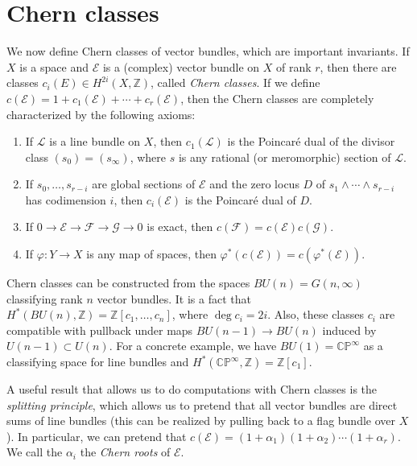 \documentclass{amsart}
\theoremstyle{definition}
\theoremstyle{remark}
\theoremstyle{plain}
\theoremstyle{definition}
\theoremstyle{remark}
\newcommand{\C}{\mathbb{C}}
\newcommand{\Z}{\mathbb{Z}}
\renewcommand{\P}{\mathbb{P}}
\newcommand{\mc}[1]{\mathcal{#1}}
\newcommand{\1}{\mathbf{1}}
\newcommand{\2}{\mathbf{2}}
\newcommand{\3}{\mathbf{3}}
\begin{document}
\section{Chern classes}

We now define Chern classes of vector bundles, which are important invariants. If $X$ is a space and $\mc{E}$ is a (complex) vector bundle on $X$ of rank $r$, then there are classes $c_i(E) \in H^{2i}(X, \Z)$, called \textit{Chern classes}. If we define $c(\mc{E}) = 1 + c_1(\mc{E}) + \cdots + c_r(\mc{E})$, then the Chern classes are completely characterized by the following axioms:
\begin{enumerate}
    \item If $\mc{L}$ is a line bundle on $X$, then $c_1(\mc{L})$ is the Poincar\'e dual of the divisor class $(s_{0}) = (s_{\infty})$, where $s$ is any rational (or meromorphic) section of $\mc{L}$.
    \item If $s_0, \ldots, s_{r-i}$ are global sections of $\mc{E}$ and the zero locus $D$ of $s_1 \wedge \cdots \wedge s_{r-i}$ has codimension $i$, then $c_i(\mc{E})$ is the Poincar\'e dual of $D$.
    \item If $0 \to \mc{E} \to \mc{F} \to \mc{G} \to 0$ is exact, then $c(\mc{F}) = c(\mc{E}) c(\mc{G})$.
    \item If $\varphi \colon Y \to X$ is any map of spaces, then $\varphi^* (c(\mc{E})) = c(\varphi^* (\mc{E}))$.
\end{enumerate}
Chern classes can be constructed from the spaces $BU(n) = G(n, \infty)$ classifying rank $n$ vector bundles. It is a fact that $H^*(BU(n), \Z) = \Z[c_1, \ldots, c_n]$, where $\deg c_i = 2i$. Also, these classes $c_i$ are compatible with pullback under maps $BU(n-1) \to BU(n)$ induced by $U(n-1) \subset U(n)$. For a concrete example, we have $BU(1) = \C\P^{\infty}$ as a classifying space for line bundles and $H^*(\C\P^{\infty}, \Z) = \Z[c_1]$.

A useful result that allows us to do computations with Chern classes is the \textit{splitting principle}, which allows us to pretend that all vector bundles are direct sums of line bundles (this can be realized by pulling back to a flag bundle over $X$). In particular, we can pretend that $c(\mc{E}) = (1 + \alpha_1)(1+\alpha_2) \cdots (1+\alpha_r)$. We call the $\alpha_i$ the \textit{Chern roots} of $\mc{E}$.
\end{document}
